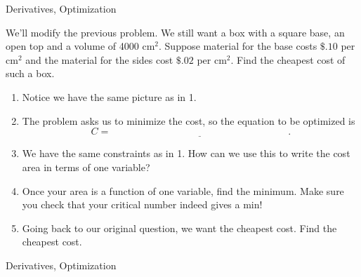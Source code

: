 
\begin{tagblock}{Derivatives, Optimization}

\begin{question}

We'll modify the previous problem.  We still want a box with a square base, an open top and a volume of 4000 $\text{cm}^2$.  Suppose material for the base costs $\$.10$ per $\text{cm}^2$ and the material for the sides cost $\$.02$  per $\text{cm}^2$.  Find the cheapest cost of such a box.  
\begin{enumerate}
 \item Notice we have the same picture as in 1.
\item The problem asks us to minimize the cost, so the equation to be optimized is \\
 \bigskip
 $$C=\underline{\hspace{3in}} .$$
 \item We have the same constraints as in 1.   How can we use this to write the cost area in terms of one variable?
 \vspace{1in} 
  \item Once your area is a function of one variable, find the minimum.  Make sure you check that your critical number indeed gives a min!
 
\vspace{3in}
 \item Going back to our original question, we want the cheapest cost.  Find the cheapest cost.
 \end{enumerate}



	
\begin{tags}
	   Derivatives, Optimization

\end{tags}
	
\begin{diary}
\end{diary}
	
\begin{solution}
	   
\end{solution}
	
\end{question}

\end{tagblock}

